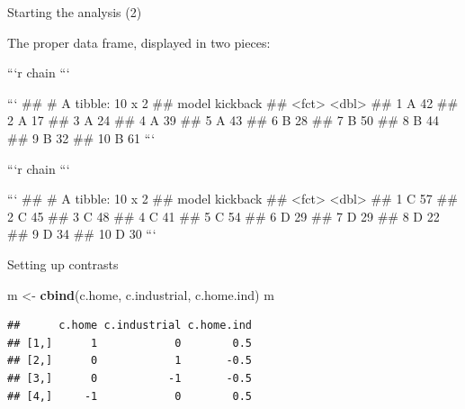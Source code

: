 \documentclass[ignorenonframetext,]{beamer}
\newenvironment{Shaded}{\begin{snugshade}}{\end{snugshade}}
\newcommand{\KeywordTok}[1]{\textcolor[rgb]{0.13,0.29,0.53}{\textbf{#1}}}
\newcommand{\NormalTok}[1]{#1}
\newcommand{\OperatorTok}[1]{\textcolor[rgb]{0.81,0.36,0.00}{\textbf{#1}}}
\newcommand{\StringTok}[1]{\textcolor[rgb]{0.31,0.60,0.02}{#1}}
\begin{document}
\begin{frame}{Starting the analysis (2)}
\protect\hypertarget{starting-the-analysis-2}{}

The proper data frame, displayed in two pieces:

\begin{multicols}{2}

```r
chain %
```

```
## # A tibble: 10 x 2
##    model kickback
##    <fct>    <dbl>
##  1 A           42
##  2 A           17
##  3 A           24
##  4 A           39
##  5 A           43
##  6 B           28
##  7 B           50
##  8 B           44
##  9 B           32
## 10 B           61
```

 


```r
chain %
```

```
## # A tibble: 10 x 2
##    model kickback
##    <fct>    <dbl>
##  1 C           57
##  2 C           45
##  3 C           48
##  4 C           41
##  5 C           54
##  6 D           29
##  7 D           29
##  8 D           22
##  9 D           34
## 10 D           30
```

 
\end{multicols}

\end{frame}

\begin{frame}[fragile]{Setting up contrasts}
\protect\hypertarget{setting-up-contrasts}{}

\begin{Shaded}
\begin{Highlighting}[]
\NormalTok{m <-}\StringTok{ }\KeywordTok{cbind}\NormalTok{(c.home, c.industrial, c.home.ind)}
\NormalTok{m}
\end{Highlighting}
\end{Shaded}

\begin{verbatim}
##      c.home c.industrial c.home.ind
## [1,]      1            0        0.5
## [2,]      0            1       -0.5
## [3,]      0           -1       -0.5
## [4,]     -1            0        0.5
\end{verbatim}

\begin{Shaded}
\end{Shaded}

\end{frame}
\end{document}
